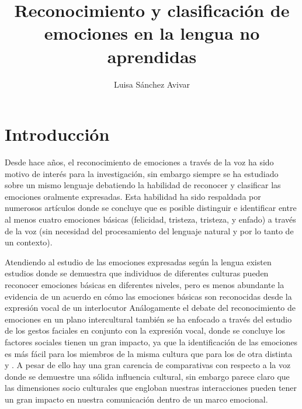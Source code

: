 \documentclass[11pt,a4paper,spanish]{book}
\begin{document}
	\title{Reconocimiento y clasificación de emociones en la lengua no aprendidas}
	\author{Luisa Sánchez Avivar}
	
	

	\mainmatter
	\chapter{Introducción}
	Desde hace años, el reconocimiento de emociones a través de la voz ha sido motivo de interés para la investigación, sin embargo siempre se ha estudiado sobre un mismo lenguaje debatiendo la habilidad de reconocer y clasificar las emociones oralmente expresadas. Esta habilidad ha sido respaldada por numerosos artículos donde se concluye que es posible distinguir e identificar entre al menos cuatro emociones básicas (felicidad, tristeza, tristeza, y enfado) a través de la voz (sin necesidad del procesamiento del lenguaje natural y por lo tanto de un contexto).
	
	Atendiendo al estudio de las emociones expresadas según la lengua existen estudios donde se demuestra que individuos de diferentes culturas pueden reconocer emociones básicas en diferentes niveles, pero es menos abundante la evidencia de un acuerdo en cómo las emociones básicas son reconocidas desde la expresión vocal de un interlocutor \cite{Pell2009a}
	Análogamente el debate del reconocimiento de emociones en un plano intercultural también se ha enfocado a través del estudio de los gestos faciales en conjunto con la expresión vocal, donde se concluye los factores sociales tienen un gran impacto, ya que la identificación de las emociones es más fácil para los miembros de la misma cultura que para los de otra distinta \cite{Pell2009a} y \cite{Pell2009}. A pesar de ello hay una gran carencia de comparativas con respecto a la voz donde se demuestre una sólida influencia cultural, sin embargo parece claro que las dimensiones socio culturales que engloban nuestras interacciones pueden tener un gran impacto en nuestra comunicación dentro de un marco emocional.
	
\end{document}
